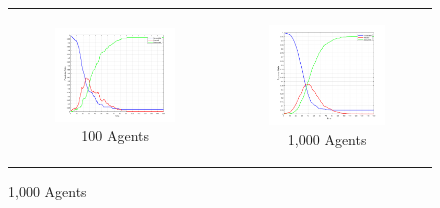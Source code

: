 \begin{figure}
\begin{center}
	\begin{tabular}{c c}
		\begin{subfigure}[b]{0.22\textwidth}
			\centering
			\includegraphics[width=1.0\textwidth, angle=0]{./fig/step1_randmonad/SIR_100agents_150t_1dt.png}
			\caption{100 Agents}
			\label{fig:sir_abs_approximating_1dt_100agents}
		\end{subfigure}
    	
    	&
    	
		\begin{subfigure}[b]{0.20\textwidth}
			\centering
			\includegraphics[width=1.0\textwidth, angle=0]{./fig/step1_randmonad/SIR_1000agents_150t_1dt.png}
			\caption{1,000 Agents}
			\label{fig:sir_abs_approximating_1dt_1000agents}
		\end{subfigure}
	\end{tabular}
	

\end{center}
\end{figure}
